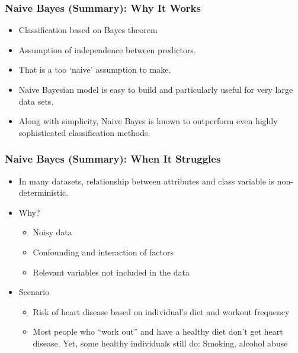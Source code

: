 \begin{frame}[fragile]\frametitle{Naive Bayes (Summary): Why It Works}
\begin{itemize}
\item Classification based on Bayes theorem
\item Assumption of independence between predictors.
\item That is a too `naive' assumption to make.
\item Naive Bayesian model is easy to build and particularly useful for very large data sets. 
\item Along with simplicity, Naive Bayes is known to outperform even highly sophisticated classification methods.
\end{itemize}
\end{frame}


\begin{frame}[fragile]\frametitle{Naive Bayes (Summary): When It Struggles}
\begin{itemize}
\item In many datasets, relationship between attributes and class variable is non-deterministic.
\item Why?
	\begin{itemize}
	\item Noisy data
	\item Confounding and interaction of factors
	\item Relevant variables not included in the data
	\end{itemize}

\item Scenario
	\begin{itemize}
	\item Risk of heart disease based on individual's diet and workout frequency
	\item Most people who ``work out'' and have a healthy diet don't get heart disease. Yet, some healthy individuals still do: Smoking, alcohol abuse
	\end{itemize}
\end{itemize}
\end{frame}